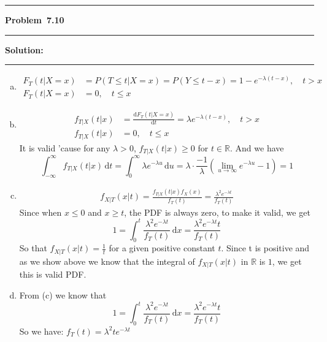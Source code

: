 \documentclass[10.5pt]{article}
\newcommand\question[1]{\vspace{.2in}\hrule\vspace{0.04in}\textbf{Problem\ #1}\vspace{.4em}\hrule\vspace{.10in}}
\newcommand\Solution{\vspace{.3in}\textbf{Solution:}\vspace{.5em}\hrule\vspace{.08in}\par}
\begin{document}
\question{7.10}
\Solution{}
\begin{enumerate}[(a)]
	\item \begin{align*}
		F_{T}(t|X = x) &= P(T\leqslant t|X = x) = P(Y\leqslant t - x) = 1-e^{-\lambda(t - x)},\quad t>x\\[6pt]
		F_{T}(t|X = x) &= 0,\quad t\leqslant x
	\end{align*}\vspace{0.5cm}
	\item \begin{align*}
		f_{T|X}(t|x) &= \frac{\mathrm{d} F_{T}(t|X = x)}{\mathrm{d} t} = \lambda e^{-\lambda(t-x)},\quad t>x\\[6pt]
		f_{T|X}(t|x) &= 0,\quad t\leqslant x
	\end{align*}
	It is valid 'cause for any $\lambda>0$, $f_{T|X}(t|x)\geqslant 0$ for $t\in\mathbb{R}$. And we have $$\int_{-\infty}^{\infty}f_{T|X}(t|x)\,\mathrm{d}t = \int_{0}^{\infty}\lambda e^{-\lambda u}\,\mathrm{d}u = \lambda\cdot\frac{-1}{\lambda}(\lim_{u\to\infty}e^{-\lambda u} - 1) = 1$$
	\vspace{0.5cm}
	\item \begin{align*}
		f_{X|T}(x|t) = \frac{f_{T|X}{(t|x)}f_X(x)}{f_T(t)} = \frac{\lambda^2 e^{-\lambda t}}{f_T(t)}
	\end{align*}
	Since when $x\leqslant0$ and $x\geqslant t$, the PDF is always zero, to make it valid, we get $$1 = \int_{0}^t \frac{\lambda^2 e^{-\lambda t}}{f_T(t)}\,\mathrm{d}x = \frac{\lambda^2 e^{-\lambda t}t}{f_T(t)}$$
	So that $f_{X|T}(x|t) = \frac{1}{t}$ for a given positive constant $t$. Since t is positive and as we show above we know that the integral of $f_{X|T}(x|t)$ in $\mathbb{R}$ is $1$, we get this is valid PDF.
	\vspace{0.5cm}
	\item From (c) we know that $$1 = \int_{0}^t \frac{\lambda^2 e^{-\lambda t}}{f_T(t)}\,\mathrm{d}x = \frac{\lambda^2 e^{-\lambda t}t}{f_T(t)}$$
	So we have: $f_T(t) = \lambda^2 t e^{-\lambda t}$
\end{enumerate}
\end{document}

